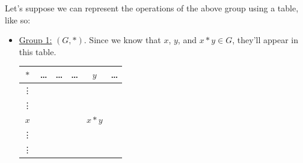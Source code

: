 \documentclass[letterpaper]{article}
\begin{document}
Let's suppose we can represent the operations of the above group using a table, like so: 
\begin{itemize}
    \item \underline{Group 1:} $(G, *)$. Since we know that $x$, $y$, and $x * y \in G$, they'll appear in this table. 
    \begin{center}
        \begin{tabular}{|c|c c c|c|c|}
            \hline 
            $*$     & \dots & \dots & \dots & $y$     & \dots \\ 
            \hline 
            \vdots  &       &       &       &         &       \\ 
            \vdots  &       &       &       &         &       \\ 
            \hline 
            $x$     &       &       &       & $x * y$ &       \\ 
            \hline 
            \vdots  &       &       &       &         &       \\ 
            \vdots  &       &       &       &         &       \\ 
            \hline 
        \end{tabular}
    \end{center}


\end{itemize}
\end{document}
